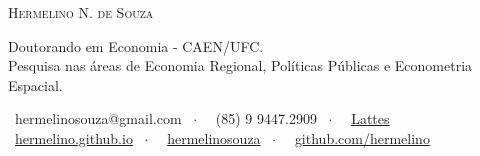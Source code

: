 \documentclass[a4paper,12pt]{article}
\begin{document}
	\par{\centering
		{\huge \textsc{Hermelino N. de Souza}}
		\par}

	\small
	\begin{center}
		Doutorando em Economia - CAEN/UFC. \\
		Pesquisa nas áreas de Economia Regional, Políticas Públicas e Econometria Espacial.
	\end{center}

	\begin{center}
			\small
			\faEnvelope \ hermelinosouza@gmail.com \ $\cdot$ \ \faPhone \ (85) 9 9447.2909 \ $\cdot$ \ \faUniversity \ \href{http://lattes.cnpq.br/3460004816166577}{Lattes} \\
			\faHome \ \href{https://hermelino.github.io/}{hermelino.github.io} \ $\cdot$ \ \faLinkedin \ \href{https://www.linkedin.com/in/hermelinosouza}{hermelinosouza} \ $\cdot$ \ \faGithub \ \href{https://github.com/hermelino}{github.com/hermelino} \\
	\end{center}
\end{document}
